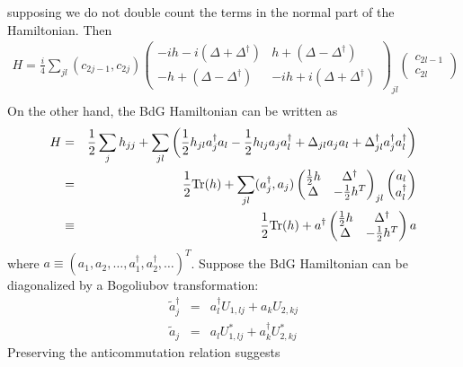 supposing we do not double count the terms in the normal part of the Hamiltonian. Then
\begin{eqnarray}
H = \frac{i}{4} \sum_{jl} (c_{2j-1}, c_{2j})\begin{pmatrix}
	-ih -i(\Delta + \Delta^\dag) & h + (\Delta-\Delta^\dag )\\
	-h + (\Delta - \Delta^\dag) & -ih + i(\Delta +\Delta^\dag)
\end{pmatrix}_{jl}\begin{pmatrix}
	c_{2l-1} \\
	c_{2l}
\end{pmatrix}\\\nonumber
\end{eqnarray}
On the other hand, the BdG Hamiltonian can be written as
\begin{eqnarray}\label{eq:HBdG}
	H &=&\frac{1}{2} \sum_{j}h_{jj} + \sum_{jl} \left( \frac{1}{2}h_{jl} a_j^\dag a_l - \frac{1}{2}h_{lj} a_j a_l^\dag + \Delta_{jl} a_j a_l + \Delta^\dag_{jl}  a_j^\dag a_l^\dag \right) \\\nonumber
	&=& \frac{1}{2}{\rm Tr}(h) + \sum_{jl} (a_j^\dag, a_j)\begin{pmatrix}
		\frac{1}{2} h & \Delta^\dag \\
		\Delta & -\frac{1}{2}h^T
	\end{pmatrix}_{jl}\begin{pmatrix}
	a_l \\
	a_l^\dag
\end{pmatrix} \\\nonumber
&\equiv & \frac{1}{2}{\rm Tr}(h) + a^\dag \begin{pmatrix}
	\frac{1}{2} h & \Delta^\dag \\
	\Delta & -\frac{1}{2}h^T
\end{pmatrix} a
\end{eqnarray}
where $a\equiv(a_1, a_2,\dots, a_1^\dag, a_2^\dag,\dots)^T$. Suppose the BdG Hamiltonian can be diagonalized by a Bogoliubov transformation:
\begin{eqnarray}\label{eq:bogoliubov}
	\tilde{a}_j^\dag &=& a_{l}^\dag U_{1,lj} + a_{k} U_{2,kj} \\\nonumber
	\tilde{a}_j &=& a_{l} U^*_{1,lj} + a^\dag_{k} U^*_{2,kj}
\end{eqnarray}
Preserving the anticommutation relation suggests
